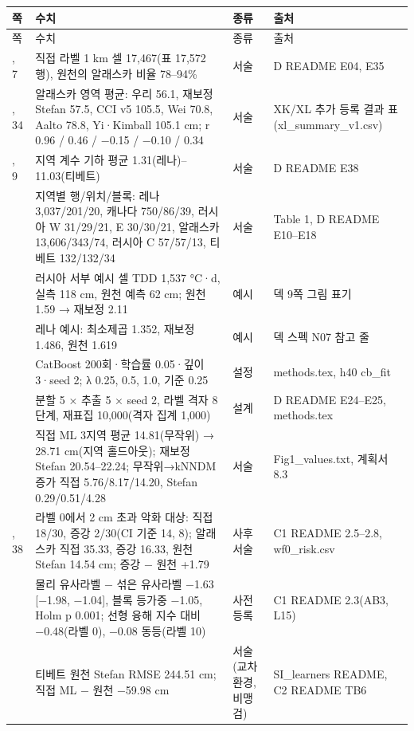 {\tabsmall
\begin{longtable}{@{}>{\raggedright\arraybackslash}p{1.2cm}>{\raggedright\arraybackslash}p{5.7cm}>{\raggedright\arraybackslash}p{2.9cm}>{\raggedright\arraybackslash}p{5.0cm}@{}}
\toprule
쪽 & 수치 & 종류 & 출처 \\
\midrule
\endfirsthead
\toprule
쪽 & 수치 & 종류 & 출처 \\
\midrule
\endhead
\bottomrule
\endfoot
1, 7 & 직접 라벨 1 km 셀 17,467(표 17,572행), 원천의 알래스카 비율 78–94\% & 서술 & D README E04, E35 \\
1, 34 & 알래스카 영역 평균: 우리 56.1, 재보정 Stefan 57.5, CCI v5 105.5, Wei 70.8, Aalto 78.8, Yi·Kimball 105.1 cm; r 0.96 / 0.46 / −0.15 / −0.10 / 0.34 & 서술 & XK/XL 추가 등록 결과 표(xl\_summary\_v1.csv) \\
1, 9 & 지역 계수 기하 평균 1.31(레나)–11.03(티베트) & 서술 & D README E38 \\
7 & 지역별 행/위치/블록: 레나 3,037/201/20, 캐나다 750/86/39, 러시아 W 31/29/21, E 30/30/21, 알래스카 13,606/343/74, 러시아 C 57/57/13, 티베트 132/132/34 & 서술 & Table 1, D README E10–E18 \\
9 & 러시아 서부 예시 셀 TDD 1,537 °C·d, 실측 118 cm, 원천 예측 62 cm; 원천 1.59 → 재보정 2.11 & 예시 & 덱 9쪽 그림 표기 \\
10 & 레나 예시: 최소제곱 1.352, 재보정 1.486, 원천 1.619 & 예시 & 덱 스펙 N07 참고 줄 \\
11 & CatBoost 200회·학습률 0.05·깊이 3·seed 2; λ {0.25, 0.5, 1.0}, 기준 0.25 & 설정 & methods.tex, h40 cb\_fit \\
13 & 분할 5 × 추출 5 × seed 2, 라벨 격자 8단계, 재표집 10,000(격자 집계 1,000) & 설계 & D README E24–E25, methods.tex \\
14 & 직접 ML 3지역 평균 14.81(무작위) → 28.71 cm(지역 홀드아웃); 재보정 Stefan 20.54–22.24; 무작위→kNNDM 증가 직접 5.76/8.17/14.20, Stefan 0.29/0.51/4.28 & 서술 & Fig1\_values.txt, 계획서 8.3 \\
24, 38 & 라벨 0에서 2 cm 초과 악화 대상: 직접 18/30, 증강 2/30(CI 기준 14, 8); 알래스카 직접 35.33, 증강 16.33, 원천 Stefan 14.54 cm; 증강 − 원천 +1.79 & 사후 서술 & C1 README 2.5–2.8, wf0\_risk.csv \\
23 & 물리 유사라벨 − 섞은 유사라벨 −1.63 [−1.98, −1.04], 블록 등가중 −1.05, Holm p 0.001; 선형 융해 지수 대비 −0.48(라벨 0), −0.08 동등(라벨 10) & 사전 등록 & C1 README 2.3(AB3, L15) \\
24 & 티베트 원천 Stefan RMSE 244.51 cm; 직접 ML − 원천 −59.98 cm & 서술(교차 환경, 비맹검) & SI\_learners README, C2 README TB6 \\

\end{longtable}}
